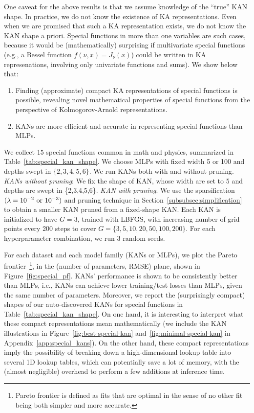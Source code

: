 \documentclass{article}
\numberwithin{equation}{section}
\numberwithin{figure}{section}
\begin{document}
One caveat for the above results is that we assume knowledge of the ``true'' KAN shape. In practice, we do not know the existence of KA representations. Even when we are promised that such a KA representation exists, we do not know the KAN shape a priori. Special functions in more than one variables are such cases, because it would be (mathematically) surprising if multivariate special functions (e.g., a Bessel function $f(\nu,x)=J_\nu(x)$) could be written in KA represenations, involving only univariate functions and sums). We show below that: 
\begin{enumerate}[(1)]
    \item Finding (approximate) compact KA representations of special functions is possible, revealing novel mathematical properties of special functions from the perspective of Kolmogorov-Arnold representations. 
    \item KANs are more efficient and accurate in representing special functions than MLPs.   
\end{enumerate}

We collect 15 special functions common in math and physics, summarized in Table~\ref{tab:special_kan_shape}. We choose MLPs with fixed width 5 or 100 and depths swept in $\{2,3,4,5,6\}$. We run KANs both with and without pruning. \textit{KANs without pruning}: We fix the shape of KAN, whose width are set to 5 and depths are swept in \{2,3,4,5,6\}.
\textit{KAN with pruning}. We use the sparsification $(\lambda=10^{-2}\ {\rm or}\ 10^{-3})$ and pruning technique in Section~\ref{subsubsec:simplification} to obtain a smaller KAN pruned from a fixed-shape KAN.  Each KAN is initialized to have $G=3$, trained with LBFGS, with increasing number of grid points every 200 steps to cover $G=\{3,5,10,20,50,100,200\}$. For each hyperparameter combination, we run 3 random seeds. 

For each dataset and each model family (KANs or MLPs), we plot the Pareto frontier~\footnote{Pareto frontier is defined as fits that are optimal in the sense of no other fit being both simpler and more accurate.}, in the (number of parameters, RMSE) plane, shown in Figure~\ref{fig:special_pf}. KANs' performance is shown to be consistently better than MLPs, i.e., KANs can achieve lower training/test losses than MLPs, given the same number of parameters. Moreover, we report the (surprisingly compact) shapes of our auto-discovered KANs for special functions in Table~\ref{tab:special_kan_shape}. On one hand, it is interesting to interpret what these compact representations mean mathematically (we include the KAN illustrations in Figure~\ref{fig:best-special-kan} and~\ref{fig:minimal-special-kan} in Appendix~\ref{app:special_kans}). On the other hand, these compact representations imply the possibility of breaking down a high-dimensional lookup table into several 1D lookup tables, which can potentially save a lot of memory, with the (almost negligible) overhead to perform a few additions at inference time.
\end{document}
